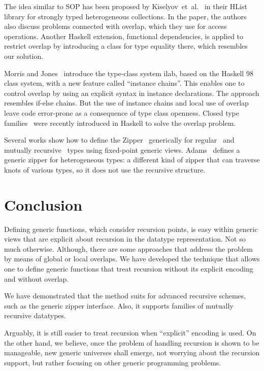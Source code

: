 \documentclass[runningheads]{llncs}
\begin{document}
The idea similar to SOP has been proposed by Kiselyov~et~al.~\cite{Kiselyov2004} in their \textsf{HList} library for strongly typed heterogeneous collections. In the paper, the authors also discuss problems connected with overlap, which they use for access operations. Another Haskell extension, functional dependencies, is applied to restrict overlap by introducing a class for type equality there, which resembles our solution.

Morris and Jones~\cite{Morris2010} introduce the type-class system \textsf{ilab}, based on the Haskell 98 class system, with a new feature called ``instance chains''. This enables one to control overlap by using an explicit syntax in instance declarations. The approach resembles if-else chains. But the use of instance chains and local use of overlap leave code error-prone as a consequence of type class openness. Closed type families~\cite{Eisenberg2014} were recently introduced in Haskell to solve the overlap problem.

Several works show how to define the Zipper~\cite{Huet1997} generically for regular~\cite{HiJeLo2004,McBride2001} and mutually recursive~\cite{MuRec2009} types using fixed-point generic views. Adams~\cite{Adams2010} defines a generic zipper for heterogeneous types: a different kind of zipper that can traverse knots of various types, so it does not use the recursive structure.



\section{Conclusion}
\label{sec:conclusion}

Defining generic functions, which consider recursion points, is easy within generic views that are explicit about recursion in the datatype representation. Not so much otherwise. Although, there are some approaches that address the problem by means of global or local overlaps. We have developed the technique that allows one to define generic functions that treat recursion without its explicit encoding and without overlap. 

We have demonstrated that the method suits for advanced recursive schemes, such as the generic zipper interface. Also, it supports families of mutually recursive datatypes. 

Arguably, it is still easier to treat recursion when ``explicit'' encoding is used. On the other hand, we believe, once the problem of handling recursion is shown to be manageable, new generic universes shall emerge, not worrying about the recursion support, but rather focusing on other generic programming problems.
\end{document}
